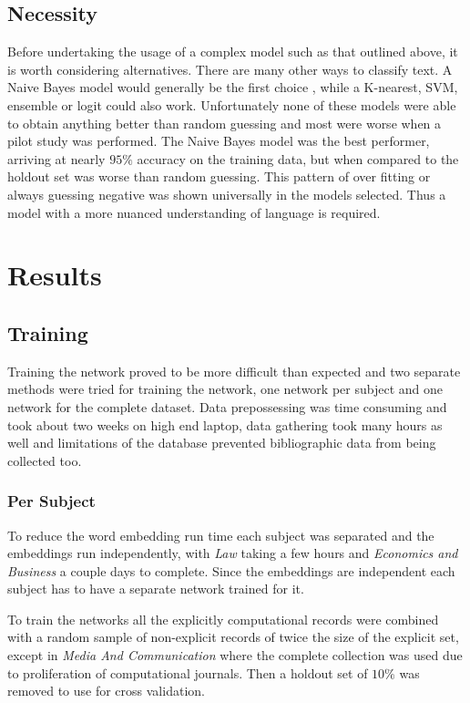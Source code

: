 \documentclass[12pt, a4paper]{article}
\begin{document}
 \subsection{Necessity}\label{ness}

Before undertaking the usage of a complex model such as that outlined above, it is worth considering alternatives. There are many other ways to classify text. A Naive Bayes model would generally be the first choice \citep{mccallum1998comparison}, while a K-nearest, SVM, ensemble or logit could also work. Unfortunately none of these models were able to obtain anything better than random guessing and most were worse when a pilot study was performed. The Naive Bayes model was the best performer, arriving at nearly $95\%$ accuracy on the training data, but when compared to the holdout set was worse than random guessing. This pattern of over fitting  or always guessing negative was shown universally in the models selected. Thus a model with a more nuanced understanding of language is required.
\section{Results}


\subsection{Training}

Training the network proved to be more difficult than expected and two separate methods were tried for training the network, one network per subject and one network for the complete dataset. Data prepossessing was time consuming and took about two weeks on high end laptop, data gathering took many hours as well and limitations of the database prevented bibliographic data from being collected too. 

\subsubsection{Per Subject}

To reduce the word embedding run time each subject was separated and the embeddings run independently, with \textit{Law} taking a few hours and \textit{Economics and Business} a couple days to complete. Since the embeddings are independent each subject has to have a separate network trained for it.

To train the networks all the explicitly computational records were combined with a random sample of non-explicit records of twice the size of the explicit set, except in \textit{Media And Communication} where the complete collection was used due to proliferation of computational journals. Then a holdout set of $10\%$ was removed to use for cross validation.
\end{document}

